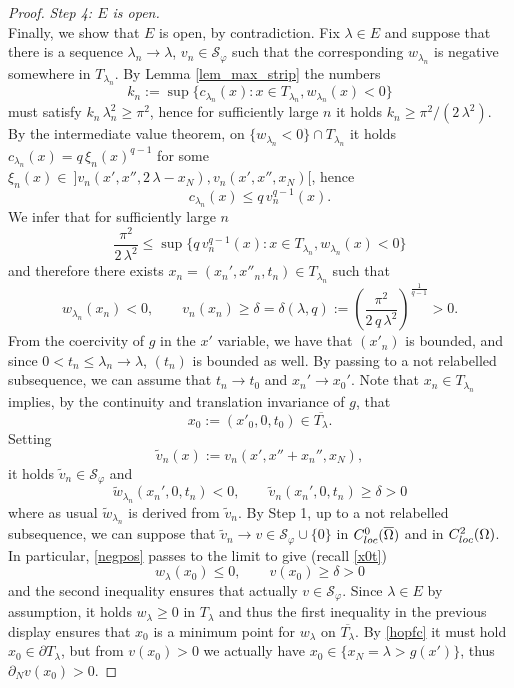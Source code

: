 \documentclass[12pt]{amsart}
\numberwithin{equation}{section}
\theoremstyle{plain}
\theoremstyle{plain}
\theoremstyle{plain}
\theoremstyle{definition}
\newcommand{\beq}{\begin{equation}}
\newcommand{\eeq}{\end{equation}}
\renewcommand{\le}{\leqslant}
\renewcommand{\ge}{\geqslant}
\newcommand{\cal}{\mathcal}
\begin{document}
\begin{proof}
 \smallskip
 {\em Step 4: $E$ is open.}\\
 Finally, we show that $E$ is open, by contradiction.
 Fix $\lambda\in E$ and suppose that there is a sequence $\lambda_n\to \lambda$, $v_n\in {\cal S}_\varphi$ such that the corresponding $w_{\lambda_n}$ is negative somewhere in $T_{\lambda_n}$. 
By Lemma \ref{lem_max_strip} the numbers
 \[
 k_n:=\sup \big\{c_{\lambda_n}(x): x\in T_{\lambda_n}, w_{\lambda_n}(x)<0 \big\}
 \]
 must satisfy $k_n\, \lambda_n^2\ge \pi^2$, hence for sufficiently large $n$ it holds $k_n\ge \pi^2/(2\, \lambda^2)$.
By the intermediate value theorem, on $\{w_{\lambda_n}<0\}\cap T_{\lambda_n}$ it holds $  c_{\lambda_n}(x)=q\, \xi_n(x)^{q-1} $
 for some $\xi_n(x)\in \ ] v_n(x', x'', 2\, \lambda-x_N), v_n(x', x'', x_N)[$, hence
 \[
 c_{\lambda_n}(x)\le q\, v_n^{q-1}(x).
 \]
 We infer that for sufficiently large $n$
\[
\frac{\pi^2}{2\, \lambda^2}\le \sup \big\{ q\, v_n^{q-1}(x): x\in T_{\lambda_n}, w_{\lambda_n}(x)<0 \big\}
\]
and therefore there exists $x_n=(x_n', x''_n, t_n)\in T_{\lambda_n}$ such that
\[
 w_{\lambda_n}(x_n)<0, \qquad v_n(x_n)\ge \delta=\delta(\lambda, q):=\left(\frac{\pi^2}{2\, q\, \lambda^2}\right)^{\frac{1}{q-1}}>0.
\]
From the coercivity of $g$ in the $x'$ variable, we have that $(x'_n)$ is bounded, and since $0<t_n\le \lambda_n\to \lambda$, $(t_n)$ is bounded as well. 
By passing to a not relabelled subsequence, we can assume that $t_n\to t_0 $ and $x_n'\to x_0'$. Note that $x_n\in T_{\lambda_n}$ implies, by the continuity and translation invariance of $g$, that 
\beq
\label{x0t}
x_0:=(x'_0, 0, t_0)\in \overline{T_\lambda}.
\eeq
 Setting 
\[
\tilde{v}_n(x):=v_n(x', x''+x_n'', x_N),
\] it holds $\tilde{v}_n\in {\cal S}_\varphi$ and
\beq
\label{negpos}
\tilde{w}_{\lambda_n}(x_n', 0, t_n)<0, \qquad \tilde{v}_n(x_n', 0, t_n)\ge\delta>0
\eeq
where as usual $\tilde{w}_{\lambda_n}$ is derived from $\tilde{v}_n$. 
By Step 1, up to a not relabelled subsequence, we can suppose that $\tilde{v}_n\to v\in {\cal S}_\varphi\cup\{0\}$ in $C^0_{\rm loc}(\overline{\Omega})$ and in $C^2_{\rm loc}(\Omega)$. 
In particular, \eqref{negpos} passes to the limit to give (recall \eqref{x0t})
\[
w_{\lambda}(x_0)\le 0, \qquad v(x_0)\ge \delta>0
\]
and the second inequality ensures that actually $v\in {\cal S}_\varphi$.
Since $\lambda\in E$ by assumption, it holds $w_\lambda\ge 0$ in $T_\lambda$ and thus the first inequality in the previous display ensures that $x_0$ is a minimum point for $w_{\lambda}$ on $\overline{T_{\lambda}}$. 
By \eqref{hopfc} it must hold $x_0\in \partial T_\lambda$, but from $v(x_0)>0$ we actually have $x_0\in \{x_N=\lambda>g(x')\}$, thus $\partial_N v(x_0)>0$. 

\end{proof}
\end{document}
